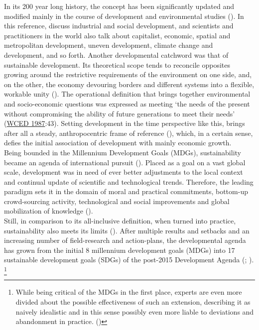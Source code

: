 \documentclass[11pt]{report}
\begin{document}
{{In its 200 year long history, the concept has been significantly updated and modified mainly in the course of development and environmental studies (\href{Vujosevic}{\citealt{vujosevic_novi_2012}}). 
In this reference, \href{Walker}{\cite{walker_capitalist_1989}}
discuss industrial and social development, and scientists and practitioners in the world also talk about capitalist, economic, spatial and metropolitan development, uneven development, climate change and development, and so forth. Another developmental catchword was that of sustainable development. Its theoretical scope tends to reconcile opposites growing around the restrictive requirements of the environment on one side, and, on the other, the economy devouring borders and different systems into a flexible, workable unity  (\href{ref}{\citealt{bolay_what_2012}}).
The operational definition that brings together environmental and socio-economic questions was expressed as meeting ‘the needs of the present without compromising the ability of future generations to meet their needs’ (\href{WCED}{WCED 1987}:43).
Setting development in the time perspective like this, brings after all a steady, anthropocentric frame of reference (\href{Lee}{\citealt{lee_global_2000}}), which, in a certain sense, defies the initial association of development with mainly economic growth.
\\

Being bounded in the Millennium Development Goals (MDGs), sustainability became an agenda of international pursuit (\href{MDG}{\citealt{united_nations_about_2000}}).
Placed as a goal on a vast global scale, development was in need of ever better adjustments to the local context and continual update of scientific and technological trends. Therefore, the leading paradigm sets it in the domain of moral and practical commitments, bottom-up crowd-sourcing activity, technological and social improvements and global mobilization of knowledge (\href{Sachs}{\citealt{sachs_millennium_2012}}).
\\

Still, in comparison to its all-inclusive definition, when turned into practice, sustainability also meets its limits (\href{ref}{\citealt{bolay_what_2012}}).
After multiple results and setbacks and an increasing number of field-research and action-plans, the developmental agenda has grown from the initial 8 millennium development goals (MDGs) into 17 sustainable development goals (SDGs) of the post-2015 Development Agenda (\href{SDG}{\citealt{un_post_2013}}; \href{Sachs}{\citealt{sachs_age_2015}}).
\footnote{While being critical of the MDGs in the first place, experts are even more divided about the possible effectiveness of such an extension, describing it as naively idealistic and in this sense possibly even more liable to deviations and abandonment in practice.
(\href{FinancialTimes}{\citealt{financial_times_experts_2015}})}
\\

}}
\end{document}
